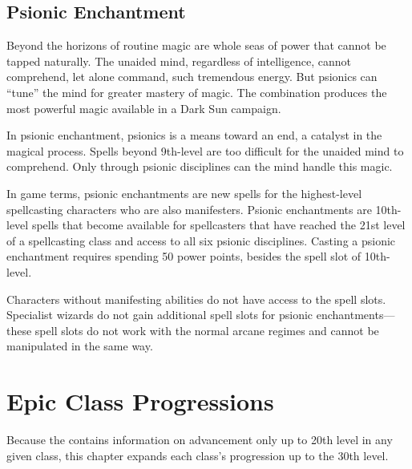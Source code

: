 

\subsection{Psionic Enchantment}
Beyond the horizons of routine magic are whole seas of power that cannot be tapped naturally. The unaided mind, regardless of intelligence, cannot comprehend, let alone command, such tremendous energy. But psionics can ``tune'' the mind for greater mastery of magic. The combination produces the most powerful magic available in a {\tableheader Dark Sun} campaign.

In psionic enchantment, psionics is a means toward an end, a catalyst in the magical process. Spells beyond 9th-level are too difficult for the unaided mind to comprehend. Only through psionic disciplines can the mind handle this magic.

In game terms, psionic enchantments are new spells for the highest-level spellcasting characters who are also manifesters. Psionic enchantments are 10th-level spells that become available for spellcasters that have reached the 21st level of a spellcasting class and access to all six psionic disciplines. Casting a psionic enchantment requires spending 50 power points, besides the spell slot of 10th-level.

Characters without manifesting abilities do not have access to the spell slots. Specialist wizards do not gain additional spell slots for psionic enchantments---these spell slots do not work with the normal arcane regimes and cannot be manipulated in the same way.

\section{Epic Class Progressions}
Because the  contains information on advancement only up to 20th level in any given class, this chapter expands each class's progression up to the 30th level.











